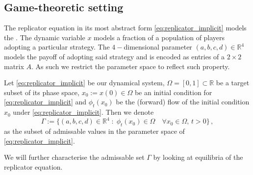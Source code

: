 \documentclass[../main.tex]{subfiles}
\begin{document}
\subsection{Game-theoretic setting}\label{subsec:aut_setting}

The replicator equation in its most abstract form \eqref{eq:replicator_implicit} models the \cite{Zino25}.
The dynamic variable $x$ models a fraction of a population of players adopting a particular strategy.
The $4-$dimensional parameter $(a,b,c,d)\in \mathbb{R}^{4}$ models the payoff of adopting said strategy and is encoded as entries of a $2\times2$ matrix $A$.
As such we restrict the parameter space to reflect such property.
\begin{definition}\label{def:admissable_set}
        Let \eqref{eq:replicator_implicit} be our dynamical system, $\Omega=[0,1]\subset \mathbb{R}$ be a target subset of its phase space, $x_{0}:=x(0)\in\Omega$ be an initial condition for \eqref{eq:replicator_implicit} and $\phi_{t}(x_{0})$ be the (forward) flow of the initial condition $x_{0}$ under \eqref{eq:replicator_implicit}.
        Then we denote
        \begin{equation*}
                \Gamma := \{(a,b,c,d)\in \mathbb{R}^{4}\;:\; \phi_{t}(x_{0})\in\Omega \quad\forall x_{0}\in\Omega,\,t>0\}\,,
        \end{equation*}
        as the subset of admissable values in the parameter space of \eqref{eq:replicator_implicit}.
\end{definition}
We will further characterise the admissable set $\Gamma$ by looking at equilibria of the replicator equation.



\end{document}
